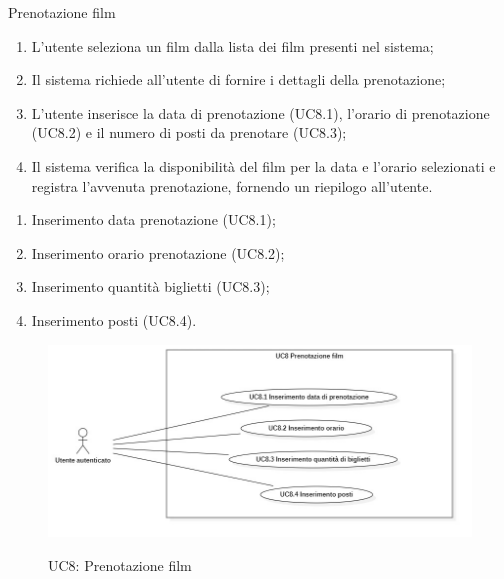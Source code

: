 \begin{usecase}{8}{Prenotazione film}\label{uc:prenotazione-film}
  \usecasemain{}
  
  \begin{enumerate}
    \item L'utente seleziona un film dalla lista dei film presenti nel sistema;
    \item Il sistema richiede all'utente di fornire i dettagli della prenotazione; 
    \item L'utente inserisce la data di prenotazione (UC8.1), l'orario di prenotazione (UC8.2) e il numero di posti da prenotare (UC8.3);
    \item Il sistema verifica la disponibilità del film per la data e l'orario selezionati e registra l'avvenuta prenotazione, fornendo un riepilogo all'utente.
  \end{enumerate}

  \newpage
  \begin{enumerate}
    \item Inserimento data prenotazione (UC8.1);
    \item Inserimento orario prenotazione (UC8.2);
    \item Inserimento quantità biglietti (UC8.3);
    \item Inserimento posti (UC8.4).
  \end{enumerate}
\end{usecase}

\begin{figure}[!ht] 
  \centering 
  \includegraphics[width=0.9\columnwidth, alt={Caso d'uso relativo alla prenotazione di un film dell'utente}]{immagini/usecase/UC8.jpg}
  \caption{UC8: Prenotazione film}\label{fig:uc:prenotazione-film}
\end{figure}

